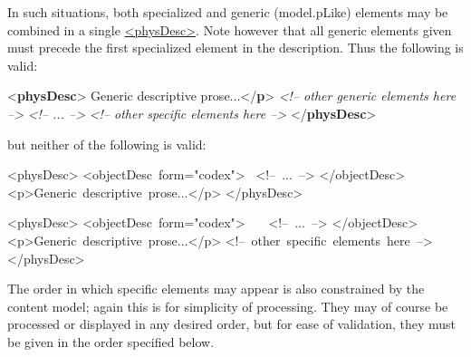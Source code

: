 In such situations, both specialized and generic (\textsf{model.pLike}) elements may be combined in a single \hyperref[TEI.physDesc]{<physDesc>}. Note however that all generic elements given must precede the first specialized element in the description. Thus the following is valid: \par\bgroup{}\exampleFont \begin{shaded}\noindent\mbox{}{<\textbf{physDesc}>}\mbox{}\newline 
{}Generic descriptive prose...{</\textbf{p}>}\mbox{}\newline 
\textit{<!-- other generic elements here -->}\mbox{}\newline 
{}\mbox{}\newline 
\textit{<!-- ... -->}\mbox{}\newline 
{}\mbox{}\newline 
\textit{<!-- other specific elements here -->}\mbox{}\newline 
{</\textbf{physDesc}>}\end{shaded}\egroup\par \noindent  but neither of the following is valid: \par\bgroup\exampleFont \begin{shaded}\noindent\mbox{}\newline
<physDesc>\newline
<objectDesc form="codex"> \newline
<!-- ... -->\newline
</objectDesc>\newline
<p>Generic descriptive prose...</p>\newline
</physDesc>\end{shaded}\egroup\par \noindent  \par\bgroup\exampleFont \begin{shaded}\noindent\mbox{}\newline
<physDesc>\newline
<objectDesc form="codex"> \newline
  <!-- ... -->\newline
</objectDesc>\newline
<p>Generic descriptive prose...</p>\newline
<!-- other specific elements here -->\newline
</physDesc>\end{shaded}\egroup\par \noindent  The order in which specific elements may appear is also constrained by the content model; again this is for simplicity of processing. They may of course be processed or displayed in any desired order, but for ease of validation, they must be given in the order specified below.
